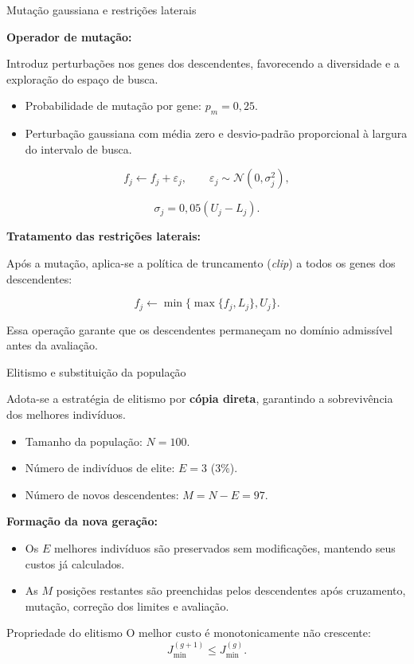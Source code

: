 \begin{frame}{Mutação gaussiana e restrições laterais}

  \textbf{Operador de mutação:}

  Introduz perturbações nos genes dos descendentes,
  favorecendo a diversidade e a exploração do espaço de busca.

  \begin{itemize}
    \item Probabilidade de mutação por gene: $p_m=0{,}25$.
    \item Perturbação gaussiana com média zero e desvio-padrão
          proporcional à largura do intervalo de busca.
  \end{itemize}

  \[
    f_j \leftarrow f_j+\varepsilon_j,
    \qquad
    \varepsilon_j\sim\mathcal{N}(0,\sigma_j^2),
  \]

  \[
    \sigma_j=0{,}05(U_j-L_j).
  \]

  \textbf{Tratamento das restrições laterais:}

  Após a mutação, aplica-se a política de truncamento
  (\textit{clip}) a todos os genes dos descendentes:

  \[
    f_j\leftarrow\min\{\max\{f_j,L_j\},U_j\}.
  \]

  Essa operação garante que os descendentes permaneçam
  no domínio admissível antes da avaliação.

\end{frame}

\begin{frame}{Elitismo e substituição da população}

  Adota-se a estratégia de elitismo por \textbf{cópia direta},
  garantindo a sobrevivência dos melhores indivíduos.

  \begin{itemize}
    \item Tamanho da população: $N=100$.
    \item Número de indivíduos de elite: $E=3$ ($3\%$).
    \item Número de novos descendentes: $M=N-E=97$.
  \end{itemize}

  \textbf{Formação da nova geração:}
  \begin{itemize}
    \item Os $E$ melhores indivíduos são preservados sem
          modificações, mantendo seus custos já calculados.
    \item As $M$ posições restantes são preenchidas pelos
          descendentes após cruzamento, mutação, correção
          dos limites e avaliação.
  \end{itemize}

  \begin{block}{Propriedade do elitismo}
    O melhor custo é monotonicamente não crescente:
    \[
      J_{\min}^{(g+1)}\leq J_{\min}^{(g)}.
    \]
  \end{block}

\end{frame}

